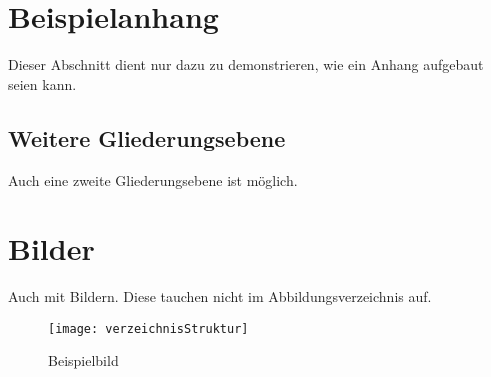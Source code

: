 \section{Beispielanhang}\label{Beispielanhang}
Dieser Abschnitt dient nur dazu zu demonstrieren, wie ein Anhang aufgebaut seien kann.
\subsection{Weitere Gliederungsebene}
Auch eine zweite Gliederungsebene ist möglich.
\section{Bilder}
Auch mit Bildern.
Diese tauchen nicht im Abbildungsverzeichnis auf.
\begin{figure}[H]
    \centering
    \caption[]{Beispielbild}
	\label{fig:Beispielbild}
    \texttt{[image: verzeichnisStruktur]}
\end{figure}